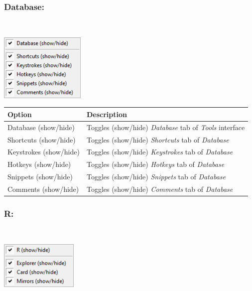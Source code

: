 \hypertarget{menu_view_tools_resources_database}{}
\subsubsection{Database:}\\

\includegraphics[scale=0.8]{./res/menu_view_tools_resources_database.png}\\

\begin{scriptsize}
  \begin{tabularx}{\textwidth}{>{\hsize=0.3\hsize}X>{\hsize=0.7\hsize}X}\\
    \hline
    \textbf{Option} & \textbf{Description} \\
    \hline
    Database (show/hide) & Toggles (show/hide) \textit{Database} tab of \textit{Tools} interface \\
    \hdashline[1pt/1pt]
    Shortcuts (show/hide) & Toggles (show/hide) \textit{Shortcuts} tab of \textit{Database} \\
    Keystrokes (show/hide) & Toggles (show/hide) \textit{Keystrokes} tab of \textit{Database} \\
    Hotkeys (show/hide) & Toggles (show/hide) \textit{Hotkeys} tab of \textit{Database} \\
    Snippets (show/hide) & Toggles (show/hide) \textit{Snippets} tab of \textit{Database} \\
    Comments (show/hide) & Toggles (show/hide) \textit{Comments} tab of \textit{Database} \\
    \hline
  \end{tabularx}
\end{scriptsize}


\hypertarget{menu_view_tools_resources_r}{}
\subsubsection{R:}\\

\includegraphics[scale=0.8]{./res/menu_view_tools_resources_r.png}\\

